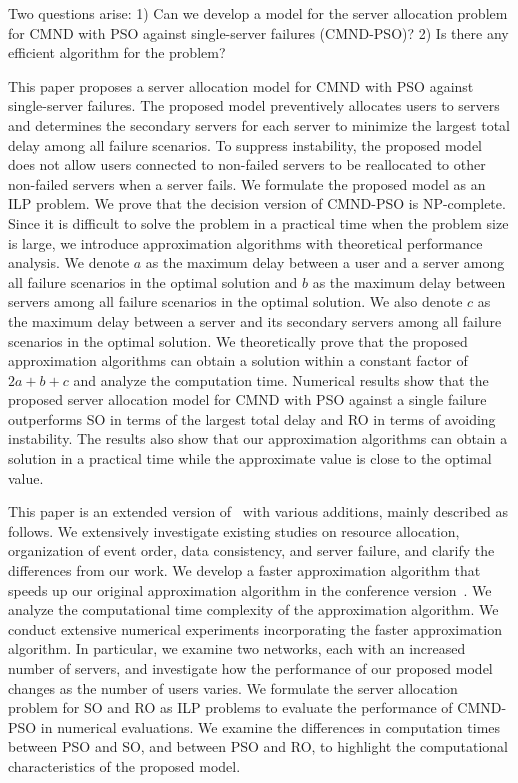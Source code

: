 \documentclass[10pt, letterpaper]{IEEEtran}
\begin{document}
\begin{CJK}{UTF8}{ipxm}
Two questions arise: 
1) Can we develop a model for the server allocation problem for CMND with PSO against single-server failures (CMND-PSO)?
2) Is there any efficient algorithm for the problem?

This paper proposes a server allocation model for CMND with PSO against single-server failures.
The proposed model preventively allocates users to servers and determines the secondary servers for each server to minimize the largest total delay among all failure scenarios.
To suppress instability, the proposed model does not allow users connected to non-failed servers to be reallocated to other non-failed servers when a server fails.
We formulate the proposed model as an ILP problem.
We prove that the decision version of CMND-PSO is NP-complete.
Since it is difficult to solve the problem in a practical time when the problem size is large, we introduce approximation algorithms with theoretical performance analysis.
We denote $a$ as the maximum delay between a user and a server among all failure scenarios in the optimal solution and $b$ as the maximum delay between servers among all failure scenarios in the optimal solution.
We also denote $c$ as the maximum delay between a server and its secondary servers among all failure scenarios in the optimal solution.
We theoretically prove that the proposed approximation algorithms can obtain a solution within a constant factor of $2a+b+c$ and analyze the computation time.
Numerical results show that the proposed server allocation model for CMND with PSO against a single failure outperforms SO in terms of the largest total delay and RO in terms of avoiding instability.
The results also show that our approximation algorithms can obtain a solution in a practical time while the approximate value is close to the optimal value.

This paper is an extended version of~\cite{Oda_ICCCN2025} with various additions, mainly described as follows.
We extensively investigate existing studies on resource allocation, organization of event order, data consistency, and server failure, and clarify the differences from our work.
We develop a faster approximation algorithm that speeds up our original approximation algorithm in the conference version~\cite{Oda_ICCCN2025}.
We analyze the computational time complexity of the approximation algorithm.
We conduct extensive numerical experiments incorporating the faster approximation algorithm. In particular, we examine two networks, each with an increased number of servers, and investigate how the performance of our proposed model changes as the number of users varies.
We formulate the server allocation problem for SO and RO as ILP problems to evaluate the performance of CMND-PSO in numerical evaluations. We examine the differences in computation times between PSO and SO, and between PSO and RO, to highlight the computational characteristics of the proposed model.


\end{CJK}
\end{document}
